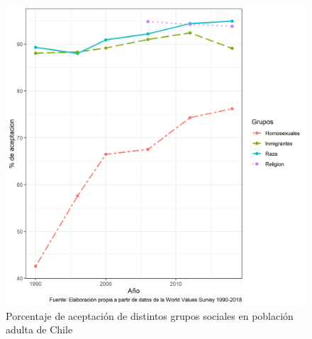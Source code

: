 \documentclass[12pt,twoside]{templates/facsothesis}
\begin{document}
\begin{figure}[H]

{\centering \includegraphics[width=1\linewidth]{images/aceptacion_wvs} 

}

\caption{Porcentaje de aceptación de distintos grupos sociales en población adulta de Chile}\label{fig:aceptacion-wvs}
\end{figure}
\end{document}

